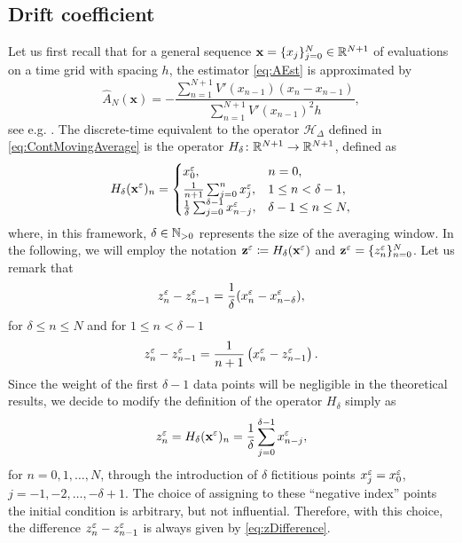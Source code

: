 \documentclass[10pt]{article}
\begin{document}
\subsection{Drift coefficient}
Let us first recall that for a general sequence $\mathbf x = \{x_j\}_{j=0}^N \in \mathbb{R}^{N+1}$ of evaluations on a time grid with spacing $h$, the estimator \eqref{eq:AEst} is approximated by
\begin{equation}\label{eq:AEstDiscrete}
	\widehat A_N(\mathbf x) = -\frac{\sum_{n=1}^{N+1} V'(x_{n-1})(x_n - x_{n-1})}{\sum_{n=1}^{N+1}V'(x_{n-1})^2 h},
\end{equation}
see e.g. \cite{PaS07}. The discrete-time equivalent to the operator $\mathcal H_\Delta$ defined in \eqref{eq:ContMovingAverage} is the operator $H_\delta\colon \mathbb{R}^{N+1} \to \mathbb{R}^{N+1}$, defined as
\begin{equation}
	H_\delta (\mathbf x^\varepsilon)_n = 
	\begin{cases}
		x^\varepsilon_0, &n = 0,\\
		\frac1{n+1} \sum_{j=0}^n x^\varepsilon_j, &1 \leq n < \delta-1,\\
		\frac1\delta \sum_{j=0}^{\delta-1} x^\varepsilon_{n-j}, &\delta - 1 \leq n \leq N,
	\end{cases} 
\end{equation}
where, in this framework, $\delta \in \mathbb{N}_{>0}$ represents the size of the averaging window. In the following, we will employ the notation $\mathbf z^\varepsilon \coloneqq H_\delta(\mathbf x^\varepsilon)$ and $\mathbf z^\varepsilon=\{z^\varepsilon_n\}_{n=0}^{N}$. Let us remark that 
\begin{equation}\label{eq:zDifference}
	z^\varepsilon_n - z^\varepsilon_{n-1} = \frac1\delta(x^\varepsilon_n - x^\varepsilon_{n-\delta}),
\end{equation}
for $\delta  \leq n \leq N$ and for $1 \leq n < \delta - 1$
\begin{equation}
	z^\varepsilon_n - z^\varepsilon_{n-1} = \frac1{n+1} \left(x_n^\varepsilon - z^\varepsilon_{n-1}\right).
\end{equation}
Since the weight of the first $\delta-1$ data points will be negligible in the theoretical results, we decide to modify the definition of the operator $H_\delta$ simply as
\begin{equation}
	z^\varepsilon_n = H_\delta (\mathbf x^\varepsilon)_n = \frac1\delta \sum_{j=0}^{\delta-1} x^\varepsilon_{n-j},
\end{equation}
for $n = 0, 1, \ldots, N$, through the introduction of $\delta$ fictitious points $x^\varepsilon_j = x^\varepsilon_0$, $j = -1, -2, \ldots, -\delta+1$. The choice of assigning to these ``negative index'' points the initial condition is arbitrary, but not influential. Therefore, with this choice, the difference $z_n^\varepsilon - z_{n-1}^\varepsilon$ is always given by \eqref{eq:zDifference}.
\end{document}
